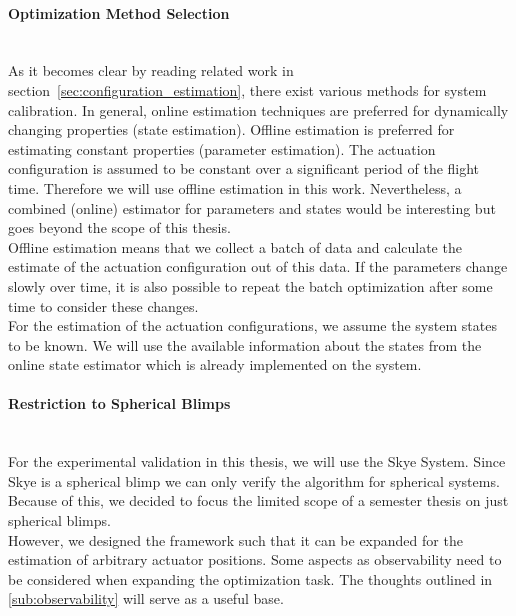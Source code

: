 \paragraph{Optimization Method Selection} ~\\
As it becomes clear by reading related work in section~\ref{sec:configuration_estimation}, there exist various methods for system calibration.
In general, online estimation techniques are preferred for dynamically changing properties (state estimation).
Offline estimation is preferred for estimating constant properties (parameter estimation).
The actuation configuration is assumed to be constant over a significant period of the flight time.
Therefore we will use offline estimation in this work.
Nevertheless, a combined (online) estimator for parameters and states would be interesting but goes beyond the scope of this thesis.
\\

Offline estimation means that we collect a batch of data and calculate the estimate of the actuation configuration out of this data.
If the parameters change slowly over time, it is also possible to repeat the batch optimization after some time to consider these changes.
\\

For the estimation of the actuation configurations, we assume the system states to be known.
We will use the available information about the states from the online state estimator which is already implemented on the system.

\paragraph{Restriction to Spherical Blimps} ~\\
For the experimental validation in this thesis, we will use the Skye System.
Since Skye is a spherical blimp we can only verify the algorithm for spherical systems.
Because of this, we decided to focus the limited scope of a semester thesis on just spherical blimps.
\\

However, we designed the framework such that it can be expanded for the estimation of arbitrary actuator positions.
Some aspects as observability need to be considered when expanding the optimization task.
The thoughts outlined in \cref{sub:observability} will serve as a useful base.

